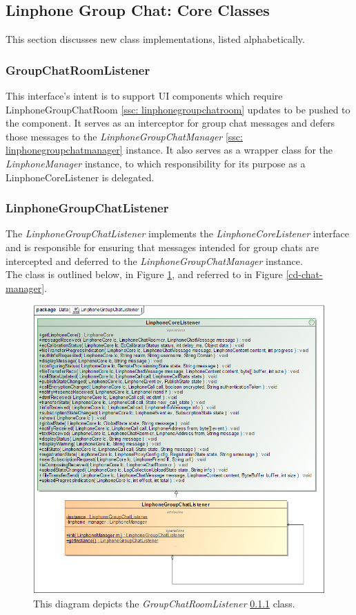 \documentclass[11pt]{article}
\begin{document}
\subsection{Linphone Group Chat: Core Classes}
This section discusses new class implementations, listed alphabetically.

\subsubsection{GroupChatRoomListener}\label{ssc: groupchatroomlistener}
This interface's intent is to support UI components which require LinphoneGroupChatRoom \ref{ssc: linphonegroupchatroom} updates to be pushed to the component. It serves as an interceptor for group chat messages and defers those messages to the \textit{LinphoneGroupChatManager} \ref{ssc: linphonegroupchatmanager} instance. It also serves as a wrapper class for the \textit{LinphoneManager} instance, to which responsibility for its purpose as a {LinphoneCoreListener} is delegated.

\subsubsection{LinphoneGroupChatListener}\label{ssc: linphonegroupchatlistener}
The \textit{LinphoneGroupChatListener} implements the \textit{LinphoneCoreListener} interface and is responsible for ensuring that messages intended for group chats are intercepted and deferred to the \textit{LinphoneGroupChatManager} instance. \\
The class is outlined below, in Figure \ref{cd_linphone_group_chat_listener}, and referred to in Figure \ref{cd-chat-manager}.
\begin{figure}[H]
	\centering
	\centering
	\centerline{\includegraphics[width=6in]{./images/linphone_group_chat_listener.png}}
	\caption[LinphoneGroupChatListener Class Diagram]{This diagram depicts the \textit{GroupChatRoomListener} \ref{ssc: groupchatroomlistener} class.}
	\label{cd_linphone_group_chat_listener}
\end{figure}
\end{document}
